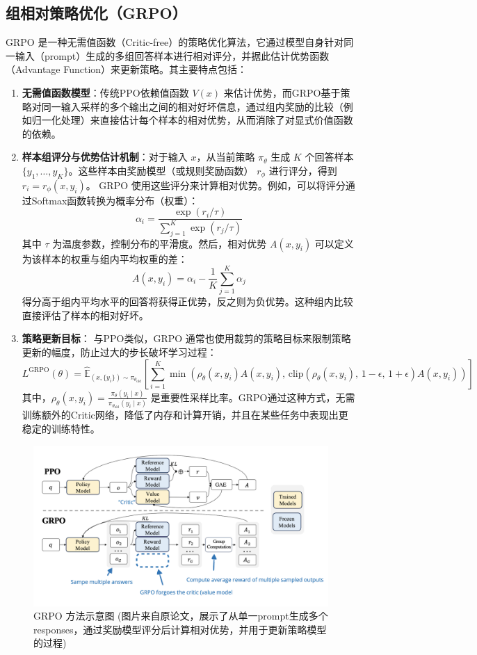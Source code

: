 \documentclass{article}
\begin{document}
\subsection{组相对策略优化（GRPO）}
GRPO \cite{shao2024deepseekmath}是一种无需值函数（Critic-free）的策略优化算法，它通过模型自身针对同一输入（prompt）生成的多组回答样本进行相对评分，并据此估计优势函数（Advantage Function）来更新策略。其主要特点包括：
\begin{enumerate}
    \item \textbf{无需值函数模型}：传统PPO依赖值函数 $V(x)$ 来估计优势，而GRPO基于策略对同一输入采样的多个输出之间的相对好坏信息，通过组内奖励的比较（例如归一化处理）来直接估计每个样本的相对优势，从而消除了对显式价值函数的依赖。
    \item \textbf{样本组评分与优势估计机制}：对于输入 $x$，从当前策略 $\pi_{\theta}$ 生成 $K$ 个回答样本 $\{y_1, \dots, y_K\}$。这些样本由奖励模型（或规则奖励函数） $r_{\phi}$ 进行评分，得到 $r_i = r_{\phi}(x, y_i)$。
    GRPO 使用这些评分来计算相对优势。例如，可以将评分通过Softmax函数转换为概率分布（权重）：
    \[
    \alpha_i = \frac{\exp(r_i / \tau)}{\sum_{j=1}^K \exp(r_j / \tau)}
    \]
    其中 $\tau$ 为温度参数，控制分布的平滑度。然后，相对优势 $A(x, y_i)$ 可以定义为该样本的权重与组内平均权重的差：
    \[
    A(x, y_i) = \alpha_i - \frac{1}{K} \sum_{j=1}^K \alpha_j
    \]
    得分高于组内平均水平的回答将获得正优势，反之则为负优势。这种组内比较直接评估了样本的相对好坏。
    \item \textbf{策略更新目标}：
    与PPO类似，GRPO 通常也使用裁剪的策略目标来限制策略更新的幅度，防止过大的步长破坏学习过程：
    \[
    L^{\text{GRPO}}(\theta) = \hat{\mathbb{E}}_{(x, \{y_i\}) \sim \pi_{\theta_{\text{old}}}} \left[ \sum_{i=1}^K \min \left( \rho_{\theta}(x, y_i) A(x, y_i), \, \text{clip}(\rho_{\theta}(x, y_i), \, 1 - \epsilon, \, 1 + \epsilon) A(x, y_i) \right) \right]
    \]
    其中，$\rho_{\theta}(x, y_i) = \frac{\pi_{\theta}(y_i \mid x)}{\pi_{\theta_{\text{old}}}(y_i \mid x)}$ 是重要性采样比率。GRPO通过这种方式，无需训练额外的Critic网络，降低了内存和计算开销，并且在某些任务中表现出更稳定的训练特性。
\end{enumerate}

\begin{figure}[h]
    \centering
    \includegraphics[width=1\textwidth]{figures/grpo.png}
    \caption{GRPO 方法示意图 \cite{shao2024deepseekmath} (图片来自原论文，展示了从单一prompt生成多个responses，通过奖励模型评分后计算相对优势，并用于更新策略模型的过程)}
    \label{fig:grpo_illustration}
\end{figure}
\end{document}
